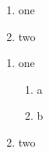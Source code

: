 \begin{enumerate}
    \item one
    \item two
\end{enumerate}

\begin{enumerate}
    \item one
    \begin{enumerate}
        \item a
        \item b
    \end{enumerate}
    \item two
\end{enumerate}